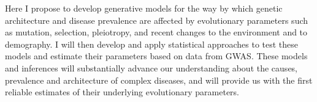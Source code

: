 \message{ !name(ResearchStrategy.tex)}\documentclass[11pt]{article}
\begin{document}

Here I propose to develop generative models for the way by which genetic architecture and disease prevalence are affected by evolutionary parameters such as mutation, selection, pleiotropy, and recent changes to the environment and to demography. I will then develop and apply statistical approaches to test these models and estimate their parameters based on data from GWAS. These models and inferences will substantially advance our understanding about the causes, prevalence and architecture of complex diseases, and will provide us with the first reliable estimates of their underlying evolutionary parameters.
\end{document}
